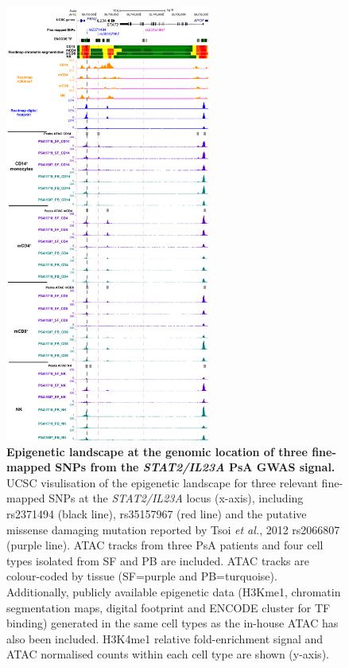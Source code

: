 \begin{figure}[htbp]
\centering
\includegraphics[width=0.6\textwidth]{./Results3/pdfs/UCSC_STAT2_IL23A_credible_set_all_cell_types_all_epigenetic_marks}
\caption[Epigenetic landscape at the genomic location of three fine-mapped SNPs from the \textit{STAT2/IL23A} PsA GWAS signal.]{\textbf{Epigenetic landscape at the genomic location of three fine-mapped SNPs from the \textit{STAT2/IL23A} PsA GWAS signal.} UCSC visulisation of the epigenetic landscape for three relevant fine-mapped SNPs at the \textit{STAT2/IL23A} locus (x-axis), including rs2371494 (black line), rs35157967 (red line) and the putative missense damaging mutation reported by Tsoi \textit{et al.}, 2012 rs2066807 (purple line). ATAC tracks from three PsA patients and four cell types isolated from SF and PB are included. ATAC tracks are colour-coded by tissue (SF=purple and PB=turquoise). Additionally, publicly available epigenetic data (H3Kme1, chromatin segmentation maps, digital footprint and ENCODE cluster for TF binding) generated in the same cell types as the in-house ATAC has also been included. H3K4me1 relative fold-enrichment signal and ATAC normalised counts within each cell type are shown (y-axis).}
\label{figure:STAT2_fine_mapping_SNPs_epigenetic_track}
\end{figure}

